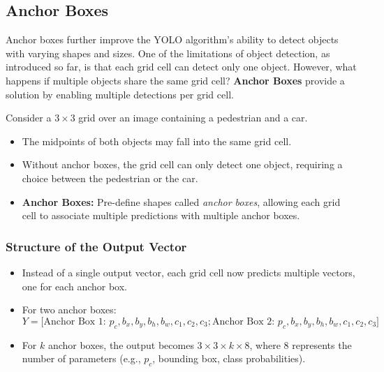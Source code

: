 \documentclass[letterpaper,12pt,notitlepage,twoside]{report}
\begin{document}
\subsection*{Anchor Boxes}
Anchor boxes further improve the YOLO algorithm's ability to detect objects with varying shapes and sizes.
One of the limitations of object detection, as introduced so far, is that each grid cell can detect only one object. However, what happens if multiple objects share the same grid cell? \textbf{Anchor Boxes} provide a solution by enabling multiple detections per grid cell.

Consider a $3 \times 3$ grid over an image containing a pedestrian and a car.
\begin{itemize}[nosep]
    \item The midpoints of both objects may fall into the same grid cell.
    \item Without anchor boxes, the grid cell can only detect one object, requiring a choice between the pedestrian or the car.
    \item \textbf{Anchor Boxes:} Pre-define shapes called \textit{anchor boxes}, allowing each grid cell to associate multiple predictions with multiple anchor boxes.
\end{itemize}

\subsubsection*{Structure of the Output Vector}
\begin{itemize}
    \item Instead of a single output vector, each grid cell now predicts multiple vectors, one for each anchor box.
    \item For two anchor boxes:
    \[
    Y = \big[\text{Anchor Box 1: } p_c, b_x, b_y, b_h, b_w, c_1, c_2, c_3; \text{Anchor Box 2: } p_c, b_x, b_y, b_h, b_w, c_1, c_2, c_3\big]
    \]
    \item For $k$ anchor boxes, the output becomes $3 \times 3 \times k \times 8$, where $8$ represents the number of parameters (e.g., $p_c$, bounding box, class probabilities).
\end{itemize}
\end{document}
